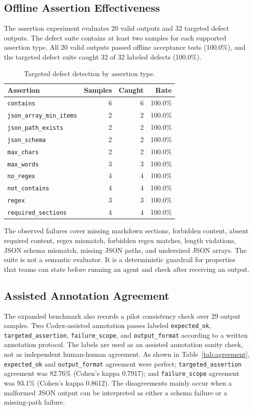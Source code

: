 \documentclass[11pt]{article}
\begin{document}
\subsection{Offline Assertion Effectiveness}

The assertion experiment evaluates 20 valid outputs and 32 targeted defect outputs.
The defect suite contains at least two samples for each supported assertion type.
All 20 valid outputs passed offline acceptance tests (100.0\%), and the targeted
defect suite caught 32 of 32 labeled defects (100.0\%).

\begin{table}[htbp]
\caption{Targeted defect detection by assertion type.}
\label{tab:assertions}
\centering
\begin{tabular}{lrrr}
\toprule
Assertion & Samples & Caught & Rate \\
\midrule
\texttt{contains} & 6 & 6 & 100.0\% \\
\texttt{json\_array\_min\_items} & 2 & 2 & 100.0\% \\
\texttt{json\_path\_exists} & 2 & 2 & 100.0\% \\
\texttt{json\_schema} & 2 & 2 & 100.0\% \\
\texttt{max\_chars} & 2 & 2 & 100.0\% \\
\texttt{max\_words} & 3 & 3 & 100.0\% \\
\texttt{no\_regex} & 4 & 4 & 100.0\% \\
\texttt{not\_contains} & 4 & 4 & 100.0\% \\
\texttt{regex} & 3 & 3 & 100.0\% \\
\texttt{required\_sections} & 4 & 4 & 100.0\% \\
\bottomrule
\end{tabular}
\end{table}

The observed failures cover missing markdown sections, forbidden content, absent
required content, regex mismatch, forbidden regex matches, length violations, JSON
schema mismatch, missing JSON paths, and undersized JSON arrays. The suite is not a
semantic evaluator. It is a deterministic guardrail for properties that teams can
state before running an agent and check after receiving an output.

\subsection{Assisted Annotation Agreement}

The expanded benchmark also records a pilot consistency check over 29 output
samples. Two Codex-assisted annotation passes labeled \texttt{expected\_ok},
\texttt{targeted\_assertion}, \texttt{failure\_scope}, and \texttt{output\_format}
according to a written annotation protocol. The labels are used as an assisted
annotation sanity check, not as independent human-human agreement. As shown in
Table~\ref{tab:agreement}, \texttt{expected\_ok} and \texttt{output\_format}
agreement were perfect; \texttt{targeted\_assertion} agreement was 82.76\%
(Cohen's kappa 0.7917); and \texttt{failure\_scope} agreement was 93.1\%
(Cohen's kappa 0.8612). The disagreements mainly occur when a malformed JSON output
can be interpreted as either a schema failure or a missing-path failure.
\end{document}

